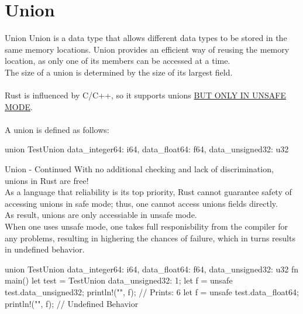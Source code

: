 \documentclass[10pt,xcolor={dvipsnames}, aspectratio=169]{beamer}
\begin{document}
\section{Union}
\begin{frame}[fragile]{Union}
	    Union is a data type that allows different data types to be stored in the same memory locations. Union provides an efficient way of reusing the memory location, as only one of its members can be accessed at a time. \\
	    The size of a union is determined by the size of its largest field. \\ \\
	    Rust is influenced by C/C++, so it supports unions \underline{BUT ONLY IN UNSAFE MODE}. \\\\ A union is defined as follows:
	    \begin{rustcode}
union TestUnion {
    data_integer64: i64,
    data_float64: f64,
    data_unsigned32: u32
}
\end{rustcode}
\end{frame}
	\begin{frame}[fragile]{Union - Continued}
	With no additional checking and lack of discrimination, unions in Rust are free!\\
    As a language that reliability is its top priority, Rust cannot guarantee safety of accessing unions in safe mode; thus, one cannot access unions fields directly. \\
    As result, unions are only accessiable in unsafe mode. \\
When one uses unsafe mode, one takes full responisbility from the compiler for any problems, resulting in highering the chances of failure, which in turns results in undefined behavior.
	        \begin{rustcode}
union TestUnion {
    data_integer64: i64, data_float64: f64, data_unsigned32: u32
}
fn main() {
    let test = TestUnion {data_unsigned32: 1};
    let f = unsafe {test.data_unsigned32};
    println!("{}", f); // Prints: 6
    let f = unsafe {test.data_float64};
    println!("{}", f); // Undefined Behavior
}
        \end{rustcode}
    \end{frame}
\end{document}
